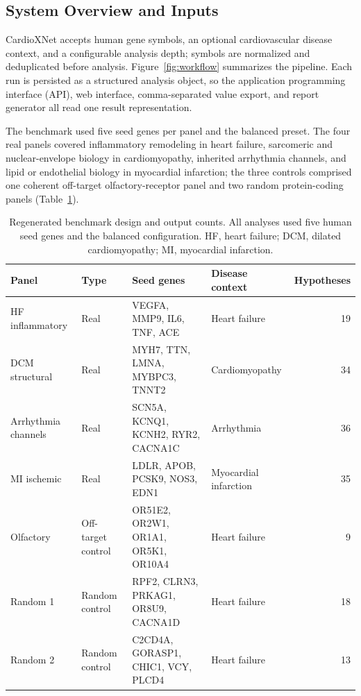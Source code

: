 \documentclass{ieeeaccess}
\begin{document}
\subsection{System Overview and Inputs}
CardioXNet accepts human gene symbols, an optional cardiovascular disease context, and a configurable analysis depth; symbols are normalized and deduplicated before analysis. Figure~\ref{fig:workflow} summarizes the pipeline. Each run is persisted as a structured analysis object, so the application programming interface (API), web interface, comma-separated value export, and report generator all read one result representation.

The benchmark used five seed genes per panel and the balanced preset. The four real panels covered inflammatory remodeling in heart failure, sarcomeric and nuclear-envelope biology in cardiomyopathy, inherited arrhythmia channels, and lipid or endothelial biology in myocardial infarction; the three controls comprised one coherent off-target olfactory-receptor panel and two random protein-coding panels (Table~\ref{tab:panels}).

\begin{table}[t]
\caption{Regenerated benchmark design and output counts. All analyses used five human seed genes and the balanced configuration. HF, heart failure; DCM, dilated cardiomyopathy; MI, myocardial infarction.}
\label{tab:panels}
\centering
\small
\begin{tabular}{p{2.15cm}p{1.85cm}p{6.8cm}p{2.7cm}r}
\toprule
Panel & Type & Seed genes & Disease context & Hypotheses \\
\midrule
HF inflammatory & Real & VEGFA, MMP9, IL6, TNF, ACE & Heart failure & 19 \\
DCM structural & Real & MYH7, TTN, LMNA, MYBPC3, TNNT2 & Cardiomyopathy & 34 \\
Arrhythmia channels & Real & SCN5A, KCNQ1, KCNH2, RYR2, CACNA1C & Arrhythmia & 36 \\
MI ischemic & Real & LDLR, APOB, PCSK9, NOS3, EDN1 & Myocardial infarction & 35 \\
Olfactory & Off-target control & OR51E2, OR2W1, OR1A1, OR5K1, OR10A4 & Heart failure & 9 \\
Random 1 & Random control & RPF2, CLRN3, PRKAG1, OR8U9, CACNA1D & Heart failure & 18 \\
Random 2 & Random control & C2CD4A, GORASP1, CHIC1, VCY, PLCD4 & Heart failure & 13 \\
\bottomrule
\end{tabular}
\end{table}
\end{document}
